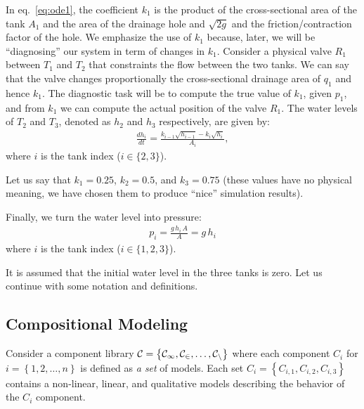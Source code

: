 %
In eq.~\ref{eq:ode1}, the coefficient $k_1$ is the product of the
cross-sectional area of the tank $A_1$ and the area of the drainage
hole and $\sqrt{2g}$ and the friction/contraction factor of the
hole. We emphasize the use of $k_1$ because, later, we will be
``diagnosing'' our system in term of changes in $k_1$. Consider a
physical valve $R_1$ between $T_1$ and $T_2$ that constraints the flow
between the two tanks. We can say that the valve changes
proportionally the cross-sectional drainage area of $q_1$ and hence
$k_1$. The diagnostic task will be to compute the true value of $k_1$,
given $p_1$, and from $k_1$ we can compute the actual position of the
valve $R_1$.
%
The water levels of $T_2$ and $T_3$, denoted as $h_2$ and $h_3$
respectively, are given by:
%
\begin{eqnarray}\label{eq:tank1}
%
\frac{d h_i}{dt} = \frac{k_{i - 1} \sqrt{h_{i - 1}} - k_i \sqrt{h_i}}{A_i},
%
\end{eqnarray}
%
where $i$ is the tank index ($i \in \{2, 3\}$).
\par
Let us say that $k_1 = 0.25$, $k_2 = 0.5$, and $k_3 = 0.75$ (these
values have no physical meaning, we have chosen them to produce
``nice'' simulation results).
\par
Finally, we turn the water level into pressure:
\begin{eqnarray}
p_i = \frac{g\,h_i\,A}{A} = g\,h_i\label{eq:pressure}
\end{eqnarray}
where $i$ is the tank index ($i \in \{1, 2, 3\}$).
\par
It is assumed that the initial water level in the three tanks is zero.
%
Let us continue with some notation and definitions.
%
\subsection{Compositional Modeling}
%
Consider a component library $\cal{C} = \left\{C_1, C_2, \ldots,
C_n\right\}$ where each component $C_i$ for $i = \left\{1, 2, \ldots,
n\right\}$ is defined as \textit{a set} of models. Each set $C_i =
\left\{C_{i, 1}, C_{i, 2}, C_{i, 3}\right\}$ contains a non-linear,
linear, and qualitative models describing the behavior of the $C_i$
component.

